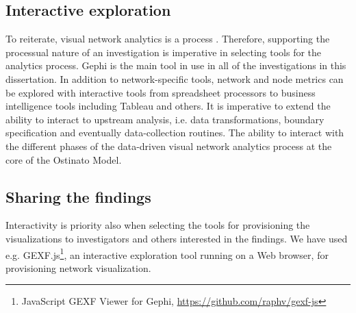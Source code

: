 

\subsection{Interactive exploration}

To reiterate, visual network analytics is a process \citep{Heer2012InteractiveAnalysis,Keim2010MasteringAnalytics}. Therefore, supporting the processual nature of an investigation is imperative in selecting tools for the analytics process. Gephi is the main tool in use in all of the investigations in this dissertation. In addition to network-specific tools, network and node metrics can be explored with interactive tools from spreadsheet processors to business intelligence tools including Tableau and others. It is imperative to extend the ability to interact to upstream analysis, i.e. data transformations, boundary specification and eventually data-collection routines. The ability to interact with the different phases of the data-driven visual network analytics process at the core of the Ostinato Model.





\subsection{Sharing the findings}

Interactivity is priority also when selecting the tools for provisioning the visualizations to investigators and others interested in the findings. We have used e.g. GEXF.js\footnote{JavaScript GEXF Viewer for Gephi, \url{https://github.com/raphv/gexf-js}}, an interactive exploration tool running on  a Web browser, for provisioning network visualization.


